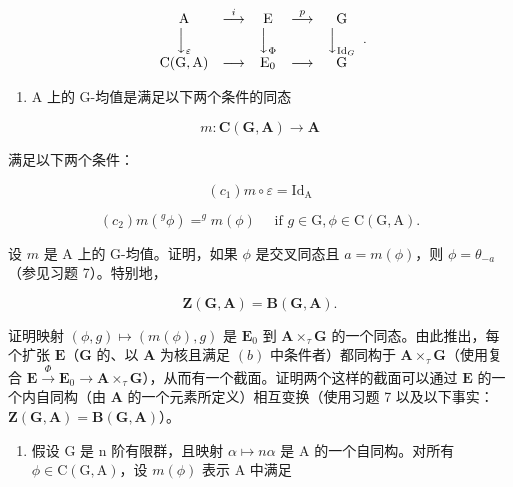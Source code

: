 \[
\begin{array}{c c c c c} \mathrm{A} & \stackrel {{i}} {{\longrightarrow}} & \mathrm{E} & \stackrel {{p}} {{\longrightarrow}} & \mathrm{G} \\ \Big \downarrow_ {\varepsilon} & & \Big \downarrow_ {\Phi} & & \Big \downarrow_ {\mathrm{Id} _ {G}} \\ \mathrm{C(G,A)} & \longrightarrow & \mathrm{E} _ {0} & \longrightarrow & \mathrm{G} \end{array} .
\]

\begin{enumerate}
\def\labelenumi{(\alph{enumi})}
\setcounter{enumi}{2}
\tightlist
\item
  A 上的 G-均值是满足以下两个条件的同态
\end{enumerate}

\[
m \colon \mathbf {C} (\mathbf {G}, \mathbf {A}) \rightarrow \mathbf {A}
\]

满足以下两个条件：

\[
(c _ {1}) m \circ \varepsilon = \mathrm{Id} _ {\mathrm{A}}
\]

\[
(c _ {2}) m (^ {g} \phi) = ^ {g} m (\phi) \quad \text { if } g \in \mathrm{G}, \phi \in \mathrm{C} (\mathrm{G}, \mathrm{A}).
\]

设 \(m\) 是 A 上的 G-均值。证明，如果 \(\phi\) 是交叉同态且 \(a = m(\phi)\)，则 \(\phi = \theta_{-a}\)（参见习题 7）。特别地，

\[
\mathbf {Z} (\mathbf {G}, \mathbf {A}) = \mathbf {B} (\mathbf {G}, \mathbf {A}).
\]

证明映射 \((\phi, g) \mapsto (m(\phi), g)\) 是 \(\mathbf{E}_0\) 到 \(\mathbf{A} \times_{\tau} \mathbf{G}\) 的一个同态。由此推出，每个扩张 \(\mathbf{E}\)（\(\mathbf{G}\) 的、以 \(\mathbf{A}\) 为核且满足 \((b)\) 中条件者）都同构于 \(\mathbf{A} \times_{\tau} \mathbf{G}\)（使用复合 \(\mathbf{E} \xrightarrow{\Phi} \mathbf{E}_0 \to \mathbf{A} \times_{\tau} \mathbf{G}\)），从而有一个截面。证明两个这样的截面可以通过 \(\mathbf{E}\) 的一个内自同构（由 \(\mathbf{A}\) 的一个元素所定义）相互变换（使用习题 7 以及以下事实：\(\mathbf{Z}(\mathbf{G}, \mathbf{A}) = \mathbf{B}(\mathbf{G}, \mathbf{A})\)）。

\begin{enumerate}
\def\labelenumi{(\alph{enumi})}
\setcounter{enumi}{3}
\tightlist
\item
  假设 G 是 n 阶有限群，且映射 \(\alpha \mapsto n\alpha\) 是 A 的一个自同构。对所有 \(\phi \in \mathrm{C}(\mathrm{G}, \mathrm{A})\)，设 \(m(\phi)\) 表示 A 中满足
\end{enumerate}

